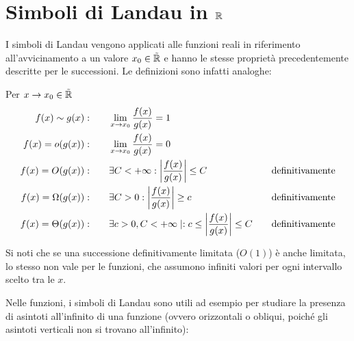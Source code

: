 %
%
%
%


\section{Simboli di Landau in \texorpdfstring{$\mathbb{R}$}{R}}
I simboli di Landau vengono applicati alle funzioni reali in riferimento all'avvicinamento a un valore $x_0\in\tilde{\mathbb{R}}$ e hanno le stesse proprietà precedentemente descritte per le successioni. Le definizioni sono infatti analoghe:
\begin{defin}
	Per $x\to x_0\in\tilde{\mathbb{R}}$
	\begin{align*}
		f(x)\sim g(x):     & \qquad \lim_{x\to x_0} \frac{f(x)}{g(x)}=1\quad                            &                        & \\
		f(x)=o(g(x)):      & \qquad \lim_{x\to x_0} \frac{f(x)}{g(x)}=0\quad                            &                        & \\
		f(x)=O(g(x)):      & \qquad \exists C<+\infty: \left\lvert \frac{f(x)}{g(x)} \right\rvert\leq C\quad               & \text{definitivamente} & \\
		f(x)=\Omega(g(x)): & \qquad \exists C>0: \left\lvert \frac{f(x)}{g(x)} \right\rvert\geq c\quad                     & \text{definitivamente} & \\
		f(x)=\Theta(g(x)): & \qquad \exists c>0,C<+\infty\mid: c\leq \left\lvert \frac{f(x)}{g(x)} \right\rvert\leq C\quad & \text{definitivamente} &
	\end{align*}
\end{defin}
Si noti che se una successione definitivamente limitata ($O(1)$) è anche limitata, lo stesso non vale per le funzioni, che assumono infiniti valori per ogni intervallo scelto tra le $x$.

Nelle funzioni, i simboli di Landau sono utili ad esempio per studiare la presenza di asintoti all'infinito di una funzione (ovvero orizzontali o obliqui, poiché gli asintoti verticali non si trovano all'infinito):
